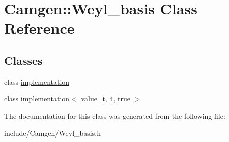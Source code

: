 \hypertarget{a00597}{}\section{Camgen\+:\+:Weyl\+\_\+basis Class Reference}
\label{a00597}
\subsection*{Classes}
\begin{DoxyCompactItemize}
\item 
class \hyperlink{a00294}{implementation}
\item 
class \hyperlink{a00305}{implementation$<$ value\+\_\+t, 4, true $>$}
\end{DoxyCompactItemize}


The documentation for this class was generated from the following file\+:\begin{DoxyCompactItemize}
\item 
include/\+Camgen/Weyl\+\_\+basis.\+h\end{DoxyCompactItemize}
